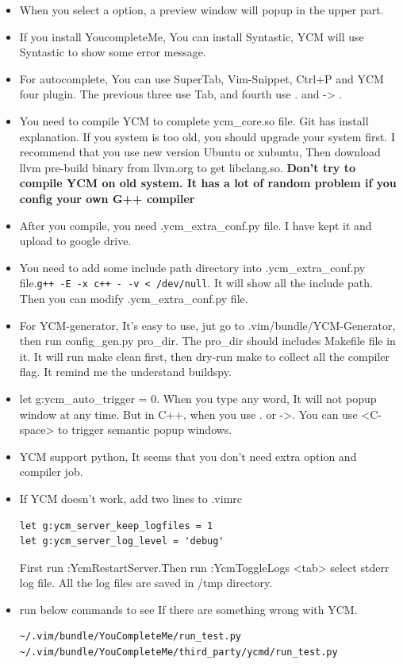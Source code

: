\documentclass[a4paper,12pt,twoside]{book}
\begin{document}
\begin{itemize}
\item When you select a option, a preview window will popup in the upper part. 

\item If you install YoucompleteMe, You can install Syntastic, YCM will use Syntastic to show some error message.   

\item For autocomplete, You can use SuperTab, Vim-Snippet, Ctrl+P and YCM four plugin. The previous three use Tab, and fourth use . and -> .

\item You need to compile YCM to complete ycm\_core.so file. Git has install explanation. If you system is too old, you should upgrade your system first. I recommend that you use new version Ubuntu or xubuntu, Then download llvm pre-build binary from llvm.org to get libclang.so. \textbf{Don't try to compile YCM on old system. It has a lot of random problem if you config your own G++ compiler}

\item After you compile, you need .ycm\_extra\_conf.py file. I have kept it and upload to google drive.

\item You need to add some include path directory into .ycm\_extra\_conf.py file.\verb=g++ -E -x c++ - -v < /dev/null=. It will show all the include path. Then you can modify .ycm\_extra\_conf.py file.

\item For YCM-generator, It's easy to use, jut go to .vim/bundle/YCM-Generator, then run config\_gen.py pro\_dir. The pro\_dir should includes Makefile file in it.  It will run make clean first, then dry-run make to collect all the compiler flag. It remind me the understand buildspy. 

\item let g:ycm\_auto\_trigger = 0. When you type any word, It will not popup window at any time. But in C++, when you use . or ->. You can use <C-space> to trigger semantic popup windows.

\item YCM support python, It seems that you don't need extra option and compiler job.		

\item If YCM doesn't work, add two lines to .vimrc 
\begin{verbatim}
let g:ycm_server_keep_logfiles = 1
let g:ycm_server_log_level = 'debug'
\end{verbatim}

First run :YcmRestartServer.Then run :YcmToggleLogs <tab> select stderr log file. All the log files are saved in /tmp directory. 

\item run below commands to see If there are something wrong with YCM. 	
\begin{verbatim}
~/.vim/bundle/YouCompleteMe/run_test.py
~/.vim/bundle/YouCompleteMe/third_party/ycmd/run_test.py
\end{verbatim}
\end{itemize}
\end{document}
